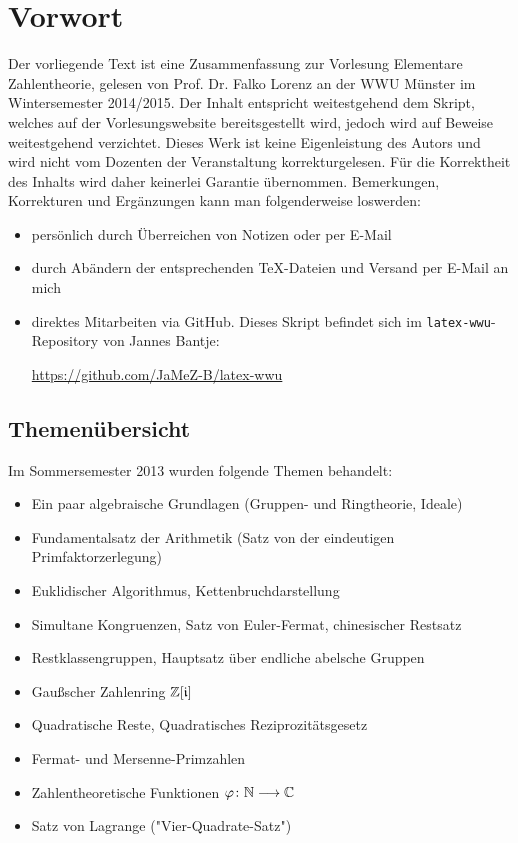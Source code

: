 \section*{Vorwort}
\label{sec:preface}
	Der vorliegende Text ist eine Zusammenfassung zur Vorlesung Elementare Zahlentheorie, gelesen von Prof. Dr. Falko Lorenz an der WWU Münster im Wintersemester 2014/2015. Der Inhalt entspricht weitestgehend dem Skript, welches auf der Vorlesungswebsite bereitsgestellt wird, jedoch wird auf Beweise weitestgehend verzichtet. Dieses Werk ist keine Eigenleistung des Autors und wird nicht vom Dozenten der Veranstaltung korrekturgelesen. Für die Korrektheit des Inhalts wird daher keinerlei Garantie übernommen. Bemerkungen, Korrekturen und Ergänzungen kann man folgenderweise loswerden:
	\begin{itemize}
		\item persönlich durch Überreichen von Notizen oder per E-Mail
		\item durch Abändern der entsprechenden TeX-Dateien und Versand per E-Mail an mich
		\item direktes Mitarbeiten via GitHub. Dieses Skript befindet sich im \texttt{latex-wwu}-Repository von Jannes Bantje:
		\begin{center}
			\url{https://github.com/JaMeZ-B/latex-wwu}
		\end{center}
	\end{itemize}

\subsection*{Themenübersicht}
\label{sub:content}
	Im Sommersemester 2013 wurden folgende Themen behandelt:
	\begin{itemize}
		\item Ein paar algebraische Grundlagen (Gruppen- und Ringtheorie, Ideale) 
		\item Fundamentalsatz der Arithmetik (Satz von der eindeutigen Primfaktorzerlegung) 
		\item Euklidischer Algorithmus, Kettenbruchdarstellung 
		\item Simultane Kongruenzen, Satz von Euler-Fermat, chinesischer Restsatz 
		\item Restklassengruppen, Hauptsatz über endliche abelsche Gruppen 
		\item Gaußscher Zahlenring $\mathbb{Z}[\mathfrak{i}]$ 
		\item Quadratische Reste, Quadratisches Reziprozitätsgesetz 
		\item Fermat- und Mersenne-Primzahlen 
		\item Zahlentheoretische Funktionen $\varphi\colon \mathbb{N} \longrightarrow \mathbb{C}$
		\item Satz von Lagrange ("Vier-Quadrate-Satz")	
	\end{itemize}

